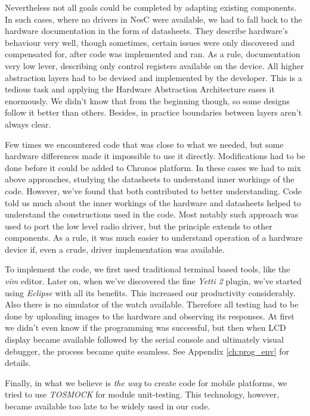 Nevertheless not all goals could be completed by adapting existing components. In such cases, where no drivers in NesC were available, we had to fall back to the hardware documentation in the form of datasheets. They describe hardware's behaviour very well, though sometimes, certain issues were only discovered and compensated for, after code was implemented and ran. As a rule, documentation very low lever, describing only control registers available on the device. All higher abstraction layers had to be devised and implemented by the developer. This is a tedious task and applying the Hardware Abstraction Architecture eases it enormously. We didn't know that from the beginning though, so some designs follow it better than others. Besides, in practice boundaries between layers aren't always clear.

Few times we encountered code that was close to what we needed, but some hardware differences made it impossible to use it directly. Modifications had to be done before it could be added to Chronos platform. In these cases we had to mix above approaches, studying the datasheets to understand inner workings of the code. However, we've found that both contributed to better understanding. Code told us much about the inner workings of the hardware and datasheets helped to understand the constructions used in the code. Most notably such approach was used to port the low level radio driver, but the principle extends to other components. As a rule, it was much easier to understand operation of a hardware device if, even a crude, driver implementation was available.

To implement the code, we first used traditional terminal based tools, like the \emph{vim} editor. Later on, when we've discovered the fine \emph{Yetti 2} plugin, we've started using \emph{Eclipse} with all its benefits. This increased our productivity considerably. Also there is no simulator of the watch available. Therefore all testing had to be done by uploading images to the hardware and observing its responses. At first we didn't even know if the programming was successful, but then when LCD display became available followed by the serial console and ultimately visual debugger, the process became quite seamless. See Appendix \ref{ch:prog_env} for details.

Finally, in what we believe is \emph{the way} to create code for mobile platforms, we tried to use \emph{TOSMOCK} for module unit-testing. This technology, however, became available too late to be widely used in our code.




